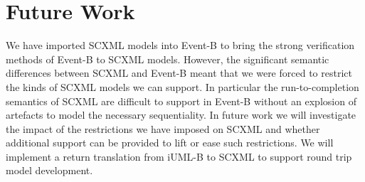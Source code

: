\documentclass{easychair}
\begin{document}











\section{Future Work}
\label{sect:future-work}
We have imported SCXML models into Event-B to bring the 
strong verification methods of Event-B to SCXML models. 
However, the significant semantic differences between SCXML 
and Event-B meant that we were forced to restrict the kinds 
of SCXML models we can support.
In particular the run-to-completion semantics of SCXML are 
difficult to support in Event-B without an explosion of 
artefacts to model the necessary sequentiality. 
In future work we will investigate the impact of the 
restrictions we have imposed on SCXML and whether 
additional support can be provided to lift or ease
such restrictions.
We will implement a return translation from iUML-B to SCXML 
to support round trip model development. 








\end{document}
